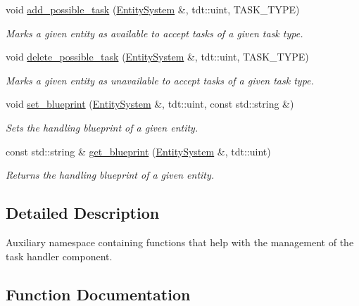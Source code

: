 \begin{DoxyCompactItemize}
void \hyperlink{namespace_task_handler_helper_a9b885ccc30e03b6c7757a952bcfa0528}{add\+\_\+possible\+\_\+task} (\hyperlink{class_entity_system}{Entity\+System} \&, tdt\+::uint, T\+A\+S\+K\+\_\+\+T\+Y\+PE)
\begin{DoxyCompactList}\small\item\em Marks a given entity as available to accept tasks of a given task type. \end{DoxyCompactList}\item 
void \hyperlink{namespace_task_handler_helper_a4e71f207fd3766e5f90386e37a92bc3f}{delete\+\_\+possible\+\_\+task} (\hyperlink{class_entity_system}{Entity\+System} \&, tdt\+::uint, T\+A\+S\+K\+\_\+\+T\+Y\+PE)
\begin{DoxyCompactList}\small\item\em Marks a given entity as unavailable to accept tasks of a given task type. \end{DoxyCompactList}\item 
void \hyperlink{namespace_task_handler_helper_a7eee782abdf6ee9075aee556b45e43f6}{set\+\_\+blueprint} (\hyperlink{class_entity_system}{Entity\+System} \&, tdt\+::uint, const std\+::string \&)
\begin{DoxyCompactList}\small\item\em Sets the handling blueprint of a given entity. \end{DoxyCompactList}\item 
const std\+::string \& \hyperlink{namespace_task_handler_helper_aa2bbf68f501dff62237f1fca028a1dd7}{get\+\_\+blueprint} (\hyperlink{class_entity_system}{Entity\+System} \&, tdt\+::uint)
\begin{DoxyCompactList}\small\item\em Returns the handling blueprint of a given entity. \end{DoxyCompactList}\end{DoxyCompactItemize}


\subsection{Detailed Description}
Auxiliary namespace containing functions that help with the management of the task handler component. 

\subsection{Function Documentation}
